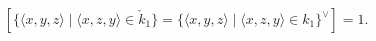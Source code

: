 $$[\{ \langle x, y, z \rangle \mid \langle x, z, y \rangle \in \check{k}_1 \} = \{ \langle x, y, z \rangle \mid \langle x, z, y \rangle \in k_1 \}^{\vee}] = 1.$$